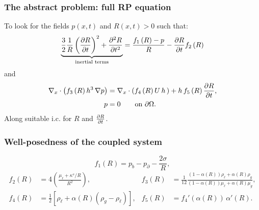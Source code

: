 \documentclass[10pt,aspectratio=169]{beamer}
\begin{document}

\begin{frame}
\frametitle{The abstract problem: full RP equation}
To look for the fields $p(x,t)$ and $R(x,t)>0$ such that:
\begin{equation}
\underbrace{\frac{3}{2}\frac{1}{R}\left(\frac{\partial R}{\partial t}\right)^2+\frac{\partial^2 R}{\partial t^2}}_{\textnormal{inertial terms}}=\frac{f_1\left(R\right)-p}{R}-\frac{\partial R}{\partial t}f_2\left(R\right)\label{eq:abstract-rp1}
\end{equation}
and
\begin{align}
\begin{split}
\nabla_x\cdot \left(f_3\left(R\right) h^3\,\nabla p\right)&=\nabla_x\cdot \left(f_4\left(R\right)U\,h\,\right)+h\,f_5\left(R\right)\frac{\partial R}{\partial t},\\
p&=0 \qquad\mbox{on } \partial \Omega.
\end{split}
\label{eq:abstract-reynolds1}
\end{align}
Along suitable i.c. for $R$ and $\frac{\partial R}{\partial t}$.

\end{frame} 


\begin{frame}
\frametitle{Well-posedness of the coupled system}
\begin{equation*}
	f_1\left(R\right)=p_b-p_\partial-\frac{2\sigma}{R},
\end{equation*}
\begin{align*}
f_2\left(R\right)&=4\left(\frac{\mu_\ell+\kappa^s/R}{R^2}\right),&f_3\left(R\right)&=\frac{1}{12}\frac{(1-\alpha\left(R\right))\rho_\ell+\alpha\left(R\right)\rho_g}{(1-\alpha\left(R\right))\mu_\ell+\alpha\left(R\right)\mu_g},\\ f_4\left(R\right)&=\frac{1}{2}\left[\rho_\ell+\alpha\left(R\right)\left(\rho_g-\rho_\ell\right)\right],&f_5\left(R\right)&=f_4'\left(\alpha\left(R\right)\right)\,\alpha'\left(R\right).
\end{align*}
\end{frame} 

\end{document}
